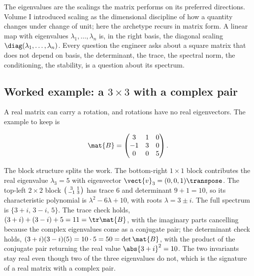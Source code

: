 \begin{archetype}[Scaling]
The eigenvalues are the scalings the matrix performs on its
preferred directions. Volume I introduced scaling as the dimensional
discipline of how a quantity changes under change of unit; here the
archetype recurs in matrix form. A linear map with eigenvalues
$\lambda_{1}, \ldots, \lambda_{n}$ is, in the right basis, the
diagonal scaling $\diag(\lambda_{1}, \ldots, \lambda_{n})$. Every
question the engineer asks about a square matrix that does not
depend on basis, the determinant, the trace, the spectral norm,
the conditioning, the stability, is a question about its spectrum.
\end{archetype}

\subsection{Worked example: a $3 \times 3$ with a complex pair}

A real matrix can carry a rotation, and rotations have no real
eigenvectors. The example to keep is

\[
\mat{B} = \begin{pmatrix} 3 & 1 & 0 \\ -1 & 3 & 0 \\ 0 & 0 & 5
\end{pmatrix}.
\]

The block structure splits the work. The bottom-right $1 \times 1$
block contributes the real eigenvalue $\lambda_{3} = 5$ with
eigenvector $\vect{v}_{3} = (0, 0, 1)\transpose$. The top-left
$2 \times 2$ block $\begin{psmallmatrix} 3 & 1 \\ -1 & 3
\end{psmallmatrix}$ has trace $6$ and determinant $9 + 1 = 10$, so
its characteristic polynomial is $\lambda^{2} - 6\lambda + 10$, with
roots $\lambda = 3 \pm i$. The full spectrum is $\{3 + i,\, 3 - i,\,
5\}$. The trace check holds, $(3 + i) + (3 - i) + 5 = 11 = \tr
\mat{B}$, with the imaginary parts cancelling because the complex
eigenvalues come as a conjugate pair; the determinant check holds,
$(3 + i)(3 - i)(5) = 10 \cdot 5 = 50 = \det \mat{B}$, with the
product of the conjugate pair returning the real value $\abs{3 +
i}^{2} = 10$. The two invariants stay real even though two of the
three eigenvalues do not, which is the signature of a real matrix
with a complex pair.


